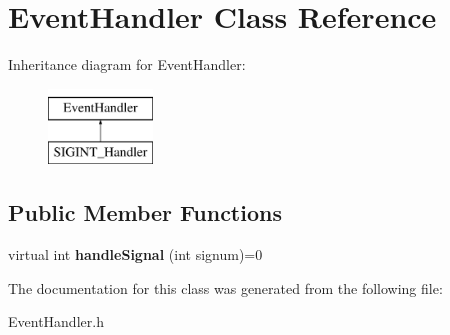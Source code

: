 \hypertarget{classEventHandler}{\section{Event\-Handler Class Reference}
\label{classEventHandler}
}
Inheritance diagram for Event\-Handler\-:\begin{figure}[H]
\begin{center}
\leavevmode
\includegraphics[height=2.000000cm]{classEventHandler}
\end{center}
\end{figure}
\subsection*{Public Member Functions}
\begin{DoxyCompactItemize}
\item 
\hypertarget{classEventHandler_a264a530841176ce475d7638dc78f1f2f}{virtual int {\bfseries handle\-Signal} (int signum)=0}\label{classEventHandler_a264a530841176ce475d7638dc78f1f2f}

\end{DoxyCompactItemize}


The documentation for this class was generated from the following file\-:\begin{DoxyCompactItemize}
\item 
Event\-Handler.\-h\end{DoxyCompactItemize}
